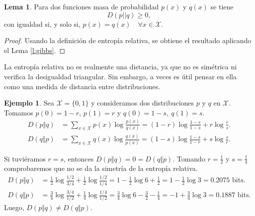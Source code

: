 \documentclass[10pt,a4paper]{article} %
\theoremstyle{definition}
\newtheorem{lemma}[theorem]{Lema}
\newtheorem{example}[theorem]{Ejemplo}
\begin{document}
\begin{lemma}\label{l:ent_rel_pos}
  Para dos funciones masa de probabilidad $p(x)$ y $q(x)$ se tiene \[
  D(p||q) \ge 0,\]
  con igualdad si, y solo si, $p(x) = q(x) \quad \forall x \in \mathcal{X}$.
\end{lemma}
\begin{proof}
  Usando la definición de entropía relativa, se obtiene el resultado aplicando el Lema \ref{l:gibbs}.
\end{proof}

La entropía relativa no es realmente una distancia, ya que no es simétrica ni verifica la desigualdad triangular. Sin embargo, a veces es útil pensar en ella como una medida de distancia entre distribuciones.

\begin{example}
  Sea $\mathcal{X} = \{0,1\}$ y consideramos dos distribuciones $p$ y $q$ en $\mathcal{X}$. Tomamos $p(0) = 1-r$, $p(1) = r$ y $q(0) = 1-s,\ q(1) = s$.
  \begin{align*}
    D(p \Vert q) &= \sum_{x \in \mathcal{X}} p(x) \log \frac{p(x)}{q(x)} = (1 - r) \log \frac{1-r}{1-s} + r \log \frac{r}{s}.\\
    D(q \Vert p) &= \sum_{x \in \mathcal{X}}q(x) \log \frac{q(x)}{p(x)} = (1-s) \log \frac{1-s}{1-r} + s \log \frac{s}{r}.
  \end{align*}

  Si tuviéramos $r=s$, entonces $D(p \Vert q) = 0 = D(q \Vert p)$.
  Tomando $r = \frac{1}{2}$ y $s = \frac{1}{4}$ comprobaremos que no se da la simetría de la entropía relativa.
  \begin{align*}
    D(p \Vert q) &= \frac{1}{2} \log \frac{1/2}{3/4} + \frac{1}{2} \log \frac{1/2}{1/4} = 1 - \frac{1}{2} \log 6 + \frac{1}{2} = 1 - \frac{1}{2} \log 3 = 0.2075 \text{ bits}.\\
    D(q \Vert p) &= \frac{3}{4} \log \frac{3/4}{1/2} + \frac{1}{4} \log \frac{1/4}{1/2} = \frac{3}{4} \log 6 - \frac{3}{2} - \frac{1}{4} = -1 + \frac{3}{4} \log 3 = 0.1887 \text{ bits}. %
  \end{align*}
Luego, $D(p\Vert q) \ne D(q \Vert p)$.\\
\end{example}
\end{document}
